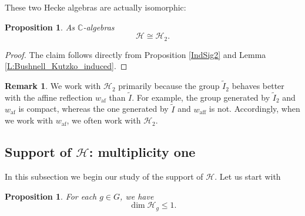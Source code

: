 \documentclass[10pt, letterpaper]{amsart}
\theoremstyle{plain}
\newtheorem{Prop}[equation]{Proposition}
\theoremstyle{definition}
\newtheorem*{Rmk}{Remark}
\numberwithin{equation}{section}
\newcommand{\It}{\widetilde{I}}
\newcommand{\aff}{\mathrm{aff}}
\newcommand{\af}{\mathrm{af}}
\newcommand{\Hcal}{\mathcal{H}}
\begin{document}
These two Hecke algebras are actually isomorphic:
\begin{Prop}\label{HIsoH2}
	As $\mathbb{C}$-algebras 
	\begin{equation*}
		\Hcal\cong \Hcal_{2}.
	\end{equation*}
\end{Prop}

\begin{proof}
	The claim follows directly from Proposition \ref{IndSig2} and Lemma \ref{L:Bushnell_Kutzko_induced}. %
\end{proof}

\begin{Rmk}
We work with $\Hcal_{2}$ primarily because the group $\It_2$ behaves better with the affine reflection $w_{\af}$ than $\It$. For example, the group generated by $\It_2$ and $w_{\af}$ is compact, whereas the one generated by $\It$ and $w_{\aff}$ is not. Accordingly, when we work with $w_{\af}$, we often work with $\Hcal_2$.
\end{Rmk}


\subsection{Support of $\Hcal$: multiplicity one}\label{SS:MultOne}


In this subsection we begin our study of the support of $\Hcal$. Let us start with

\begin{Prop}\label{HMult1}
	For each $g\in G$, we have
	\begin{equation*}
		\dim\Hcal_{g}\leq 1.
	\end{equation*}
\end{Prop}
\end{document}
